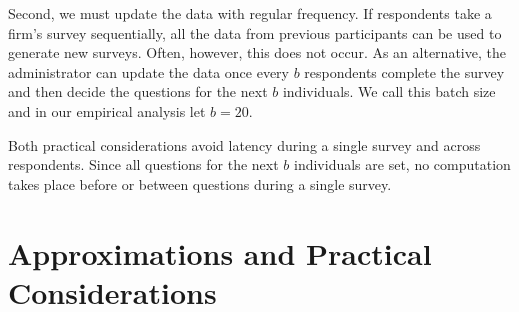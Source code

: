 \documentclass[nonblindrev]{informs3}
\begin{document}
\begin{APPENDICES}
Second, we must update the data with regular frequency. If respondents take a firm's survey sequentially, all the data from previous participants can be used to generate new surveys. Often, however, this does not occur. As an alternative, the administrator can update the data once every $b$ respondents complete the survey and then decide the questions for the next $b$ individuals. We call this batch size and in our empirical analysis let $b=20$.

Both practical considerations avoid latency during a single survey and across respondents. Since all questions for the next $b$ individuals are set, no computation takes place before or between questions during a single survey.



\section{Approximations and Practical Considerations}




\end{APPENDICES}
\end{document}
